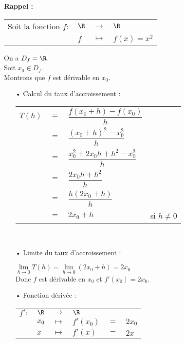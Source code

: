 \textbf{Rappel :} \\

\begin{tabular}{llll}
\hspace{-.3cm} Soit la fonction $f :$ & $\R$ & $\longrightarrow$ & $\R$ \\
& $f$ & $\longmapsto$ & $f(x) = x^2$ \\
\end{tabular}

On a $D_f = \R$. \\

Soit $x_0 \in D_f$. \\

Montrons que $f$ est dérivable en $x_0$. \\

\begin{itemize}
\item[•] Calcul du taux d'accroissement : \vspace*{.3cm}
\\
\begin{tabular}{llll}
$T(h)$ & $=$ & $\dfrac{f(x_0 + h) - f(x_0)}{h}$ & \vspace*{.3cm} \\
& $=$ & $\dfrac{\left(x_0 + h\right)^2 - x_0^2}{h}$ & \vspace*{.3cm} \\
& $=$ & $\dfrac{x_0^2 + 2x_0h + h^2 - x_0^2}{h}$ & \vspace*{.3cm} \\
& $=$ & $\dfrac{2x_0h + h^2}{h}$ & \vspace*{.3cm} \\
& $=$ & $\dfrac{h\left(2x_0 + h\right)}{h}$ & \vspace*{.3cm} \\
& $=$ & $2x_0 + h$ & si $h \neq 0$ \\
\end{tabular} \\
\vspace*{.3cm}

\item[•] Limite du taux d'accroissement : \vspace*{.3cm}

$\lim\limits_{h \to 0} T(h) = \lim\limits_{h \to 0} (2x_0 + h) = 2x_0$ \vspace*{.3cm} \\

Donc $f$ est dérivable en $x_0$ et $f'(x_0) = 2x_0$. \\

\item[•] Fonction dérivée : \\

\begin{tabular}{llllll}
$f' :$ & $\R$ & $\longrightarrow$ & $\R$ & & \\
& $x_0$ & $\longmapsto$ & $f'(x_0)$ & $ = $ & $2x_0$ \\
& $x$ & $\longmapsto$ & $f'(x)$ & $ = $ & $2x$ \\
\end{tabular}
\end{itemize}

